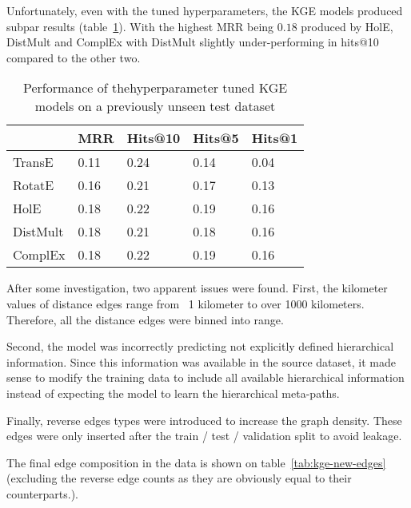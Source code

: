 Unfortunately, even with the tuned hyperparameters, the KGE models produced subpar results (table~\ref{tab:kge-res}).
With the highest MRR being $0.18$ produced by HolE, DistMult and ComplEx with DistMult slightly under-performing in
hits@10 compared to the other two.
\begin{table}[!ht]
    \centering
    \begin{tabular}{|l|l|l|l|l|}
        \hline
         & MRR & Hits@10 &  Hits@5 &  Hits@1 \\ \hline
        TransE & 0.11   & 0.24 & 0.14 & 0.04 \\ \hline
        RotatE & 0.16   & 0.21 & 0.17 & 0.13 \\ \hline
        HolE & 0.18     &  0.22 & 0.19 & 0.16 \\ \hline
        DistMult & 0.18 & 0.21 & 0.18 & 0.16 \\ \hline
        ComplEx & 0.18  & 0.22 & 0.19 & 0.16 \\ \hline
    \end{tabular}
    \caption{Performance of thehyperparameter tuned KGE models on a previously unseen test dataset}
    \label{tab:kge-res}
\end{table}

After some investigation, two apparent issues were found.
First, the kilometer values of distance edges range from ~1 kilometer to over 1000 kilometers.
Therefore, all the distance edges were binned into range.

Second, the model was incorrectly predicting not explicitly defined hierarchical information.
Since this information was available in the source dataset, it made sense to modify the training data
to include all available hierarchical information instead of expecting the model to learn the hierarchical meta-paths.

Finally, reverse edges types were introduced to increase the graph density.
These edges were only inserted after the train / test / validation split to avoid leakage.

The final edge composition in the data is shown on table~\ref{tab:kge-new-edges} (excluding the reverse edge counts
as they are obviously equal to their counterparts.).

